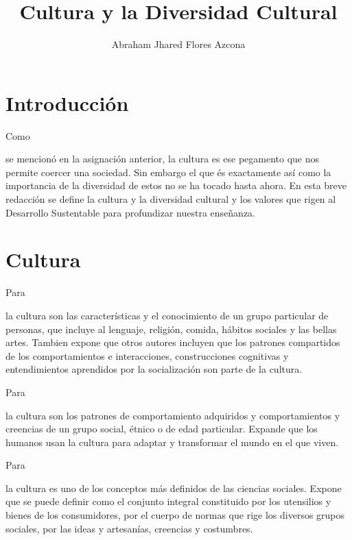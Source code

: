\documentclass[stu, 12pt, letterpaper, donotrepeattitle, floatsintext, natbib]{apa7}
\title{\Large Cultura y la Diversidad Cultural}
\author{Abraham Jhared Flores Azcona} %
\affiliation{Instituto Tecnológico de Tijuana}
\begin{document}
\maketitle


\renewcommand\contentsname{Contenido}
\tableofcontents

\newpage
\section*{Introducción}
Como \begin{justifying}
    se mencionó en la asignación anterior, la cultura es ese pegamento que nos permite coercer una sociedad. Sin embargo el que és exactamente
    así como la importancia de la diversidad de estos no se ha tocado hasta ahora. En esta breve redacción se define la cultura y la diversidad cultural
    y los valores que rigen al Desarrollo Sustentable para profundizar nuestra enseñanza.\par
\end{justifying}
\vspace{\baselineskip}
\section{Cultura}
Para \begin{justifying}
    \cite{zimmermann-2017}
    la cultura son las características y el conocimiento de un grupo particular de personas, que incluye al lenguaje, religión, comida, hábitos sociales y las bellas artes.
    Tambien expone que otros autores incluyen que los patrones compartidos de los comportamientos e interacciones, construcciones cognitivas y entendimientos aprendidos por la socialización son
    parte de la cultura.\par
\end{justifying}
Para \begin{justifying}
    \cite{tracy-evans-santa-ana-college-no-date} %
    la cultura son los patrones de comportamiento adquiridos y comportamientos y creencias de un grupo social, étnico o de edad particular. Expande que los humanos usan la cultura para
    adaptar y transformar el mundo en el que viven.\par
\end{justifying}
Para \begin{justifying}
     \cite{unknown-author-no-dateA} %
    la cultura es uno de los conceptos más definidos de las ciencias sociales. Expone que se puede definir como el conjunto integral constituido por los utensilios y bienes de los consumidores,
    por el cuerpo de normas que rige los diversos grupos sociales, por las ideas y artesanías, creencias y costumbres.\par
\end{justifying}
\vspace{\baselineskip}
\end{document}
